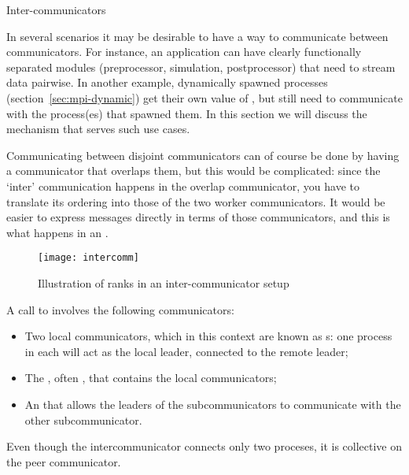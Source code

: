 
 {Inter-communicators}
\label{sec:mpi-intercomm}

In several scenarios it may be desirable to have a way to communicate
between communicators. For instance, an application can have clearly
functionally separated modules (preprocessor, simulation,
postprocessor) that need to stream data pairwise. In another example,
dynamically spawned processes (section~\ref{sec:mpi-dynamic}) get
their own value of , but still need to
communicate with the process(es) that spawned them. In this section we
will discuss the  mechanism that
serves such use cases.

Communicating between disjoint communicators can of course be done by
having a
communicator that overlaps them, but this would be complicated: since
the `inter' communication happens in the overlap communicator, you
have to translate its ordering into those of the two worker
communicators. It would be easier to express messages directly in
terms of those communicators, and this is what happens in an
.

\begin{figure}[ht]
  \texttt{[image: intercomm]}
  \caption{Illustration of ranks in an inter-communicator setup}
  \label{fig:intercomm}
\end{figure}

A call to
involves the following communicators:
\begin{itemize}
\item Two local communicators, which in this context are known as
  s: one process in each will act as
  the local leader, connected to the remote leader;
\item The , often
  , that contains the local
  communicators;
\item An  that allows the leaders
  of the subcommunicators to communicate with the other subcommunicator.
\end{itemize}
Even though the intercommunicator connects only two proceses, it is
collective on the peer communicator.

